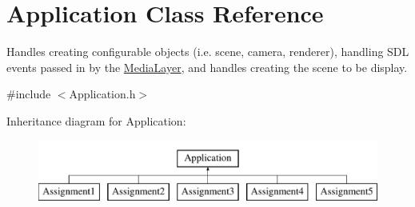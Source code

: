 \hypertarget{class_application}{}\section{Application Class Reference}
\label{class_application}


Handles creating configurable objects (i.\+e. scene, camera, renderer), handling S\+DL events passed in by the \hyperlink{class_media_layer}{Media\+Layer}, and handles creating the scene to be display.




{\ttfamily \#include $<$Application.\+h$>$}

Inheritance diagram for Application\+:\begin{figure}[H]
\begin{center}
\leavevmode
\includegraphics[height=2.000000cm]{class_application}
\end{center}
\end{figure}

